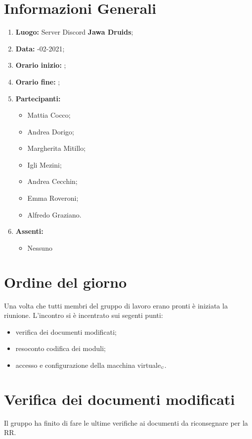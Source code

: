 \newpage
\section{Informazioni Generali}
\begin{enumerate}
  \item \textbf{Luogo:} \normalfont Server Discord \textbf{Jawa Druids};
  \item \textbf{Data:} -02-2021;
  \item \textbf{Orario inizio:} ;
  \item \textbf{Orario fine:} ;
  \item \textbf{Partecipanti:}
  \begin{itemize}
    \item Mattia Cocco;
    \item Andrea Dorigo;
    \item Margherita Mitillo;
    \item Igli Mezini;
    \item Andrea Cecchin;
    \item Emma Roveroni;
    \item Alfredo Graziano.
  \end{itemize}
  \item \textbf{Assenti:}
  \begin{itemize}
    \item Nessuno
  \end{itemize}
\end{enumerate}
\section{Ordine del giorno}
Una volta che tutti membri del gruppo di lavoro erano pronti è iniziata la riunione. L'incontro si è incentrato sui segenti punti:
\begin{itemize}
  \item verifica dei documenti modificati;
  \item resoconto codifica dei moduli;
  \item accesso e configurazione della macchina virtuale$_{\scaleto{G}{3pt}}$.
\end{itemize}

\section{Verifica dei documenti modificati}
Il gruppo ha finito di fare le ultime verifiche ai documenti da riconsegnare per la RR.



